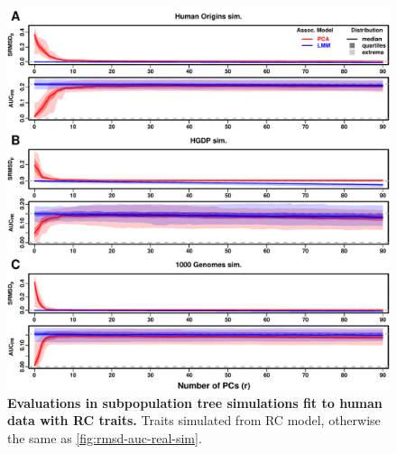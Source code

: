 \documentclass[11pt]{article}
\begin{document}
\begin{figure}[hp!]
  \centering
  \includegraphics[width=\textwidth,height=\textheight,keepaspectratio]{rmsd-auc-real-sim.pdf}
  \caption{
    {\bf Evaluations in subpopulation tree simulations fit to human data with RC traits.}
    Traits simulated from RC model, otherwise the same as \cref{fig:rmsd-auc-real-sim}.
  }
  \label{fig:rmsd-auc-real-sim-rc}
\end{figure}
\end{document}
